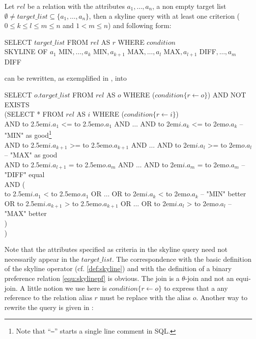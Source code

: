 Let $rel$ be a relation with the attributes $a_1, \ldots, a_n$, a non
empty target list $\emptyset \not= target\_list \subseteq \{a_1,
\ldots, a_n\}$, then a skyline query with at least one criterion ($0
\le k \le l \le m \le n$ and $1 < m \le n$) and following form:
%
\begin{sql}
SELECT $target\_list$ FROM $rel$ AS $r$ WHERE $condition$ \\
SKYLINE OF $a_1$ MIN$, \ldots, a_k$ MIN$, a_{k+1}$ MAX$, \ldots, a_l$ MAX$, a_{l+1}$ DIFF$, \ldots, a_m$ DIFF
\end{sql}
%
can be rewritten, as exemplified in \citep{Borzsonyi2001}, into
%
\begin{sql}\label{sql:rewritten-non-distinct}
\newcommand\abox[1]{\hbox to 2.5em{#1\hfil}}%
\newcommand\bbox[1]{\hbox to 2em{#1\hfil}}%
SELECT $o.target\_list$ FROM $rel$ AS $o$ WHERE ($condition\{r \gets o\}$) AND NOT EXISTS \\
(SELECT * FROM $rel$ AS $i$ WHERE ($condition\{r \gets i\}$) \\
AND \abox{$i.a_1$} <= \abox{$o.a_1$} AND $\ldots$ AND \bbox{$i.a_k$} <= \bbox{$o.a_k$} -- "MIN" as good\footnote{Note that ``\texttt{--}'' starts a single line comment in SQL.}\\
AND \abox{$i.a_{k+1}$} >= \abox{$o.a_{k+1}$} AND $\ldots$ AND \bbox{$i.a_l$} >= \bbox{$o.a_l$} -- "MAX" as good\\
AND \abox{$i.a_{l+1}$} { }= \abox{$o.a_m$} AND $\ldots$ AND \bbox{$i.a_m$} { }= \bbox{$o.a_m$} -- "DIFF" equal \\
AND (\\
\phantom{{ }{ }{ }}\abox{$i.a_1$} < \abox{$o.a_1$} OR $\ldots$ OR \bbox{$i.a_k$} < \bbox{$o.a_k$} -- "MIN" better \\
OR \abox{$i.a_{k+1}$} > \abox{$o.a_{k+1}$} OR $\ldots$ OR \bbox{$i.a_l$} > \bbox{$o.a_l$} -- "MAX" better \\
)\\
)
\end{sql}

Note that the attributes specified as criteria in the skyline query
need not necessarily appear in the $target\_list$.
%
The correspondence with the basic definition of the skyline operator
(cf. \autoref{def:skyline}) and with the definition of a binary
preference relation \eqref{equ:skylinepf} is obvious.
%
The join is a $\theta$-join and not an equi-join.
%
A little notion we use here is $condition\{r \gets o\}$ to express
that a any reference to the relation alias $r$ must be replace with
the alias $o$.
%
Another way to rewrite the query is given in
\citep[Page~3]{Godfrey2004}:

